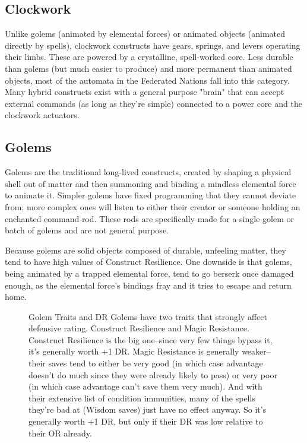 \subsection{Clockwork}
Unlike golems (animated by elemental forces) or animated objects (animated directly by spells), clockwork constructs have gears, springs, and levers operating their limbs. These are powered by a crystalline, spell-worked core. Less durable than golems (but much easier to produce) and more permanent than animated objects, most of the automata in the Federated Nations fall into this category. Many hybrid constructs exist with a general purpose "brain" that can accept external commands (as long as they're simple) connected to a power core and the clockwork actuators.

\subsection{Golems}
Golems are the traditional long-lived constructs, created by shaping a physical shell out of matter and then summoning and binding a mindless elemental force to animate it. Simpler golems have fixed programming that they cannot deviate from; more complex ones will listen to either their creator or someone holding an enchanted command rod. These rods are specifically made for a single golem or batch of golems and are not general purpose.

Because golems are solid objects composed of durable, unfeeling matter, they tend to have high values of Construct Resilience. One downside is that golems, being animated by a trapped elemental force, tend to go berserk once damaged enough, as the elemental force's bindings fray and it tries to escape and return home.

\begin{figure}
	\begin{DndComment}{Golem Traits and DR}
		Golems have two traits that strongly affect defensive rating. Construct Resilience and Magic Resistance. Construct Resilience is the big one--since very few things bypass it, it's generally worth +1 DR. Magic Resistance is generally weaker--their saves tend to either be very good (in which case advantage doesn't do much since they were already likely to pass) or very poor (in which case advantage can't save them very much). And with their extensive list of condition immunities, many of the spells they're bad at (Wisdom saves) just have no effect anyway. So it's generally worth +1 DR, but only if their DR was low relative to their OR already.
	\end{DndComment}
\end{figure}

